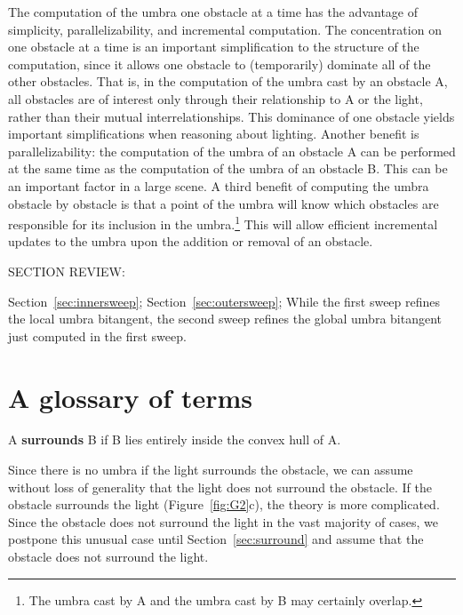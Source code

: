 \documentclass[9pt]{article}
\begin{document}
The computation of the umbra one obstacle at a time has the advantage
of simplicity, parallelizability, and incremental computation.
The concentration on one obstacle at a time is
an important simplification to the structure of the computation,
since it allows one obstacle to (temporarily) dominate all of the other obstacles.
That is, in the computation of the umbra cast by an obstacle A, 
all obstacles are of interest only through their relationship
to A or the light, rather than their mutual interrelationships.
This dominance of one obstacle yields important simplifications when
reasoning about lighting.
Another benefit is parallelizability:
the computation of the umbra of an obstacle A can be performed at the same
time as the computation of the umbra of an obstacle B.
This can be an important factor in a large scene.
A third benefit of computing the umbra obstacle by obstacle
is that a point of the umbra will know which obstacles are
responsible for its inclusion in the umbra.\footnote{The umbra cast by 
	A and the umbra cast by B may certainly overlap.}
This will allow efficient incremental updates to the umbra upon the addition
or removal of an obstacle.


SECTION REVIEW:

Section~\ref{sec:innersweep};
Section~\ref{sec:outersweep};
While the first sweep refines the local umbra bitangent,
the second sweep refines the global umbra bitangent
just computed in the first sweep.


\section{A glossary of terms}

\begin{defn2}
\label{defn:surround}
A {\bf surrounds} B if B lies entirely inside the convex hull of A.
\end{defn2}

Since there is no umbra if the light surrounds the obstacle, 
we can assume without loss of generality 
that the light does not surround the obstacle.
If the obstacle surrounds the light (Figure~\ref{fig:G2}c),
the theory is more complicated.
Since the obstacle does not surround the light in the vast majority
of cases, we postpone this unusual case until Section~\ref{sec:surround}
and assume that the obstacle does not surround the light.
\end{document}

